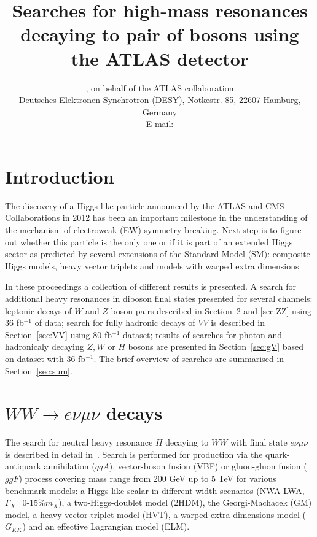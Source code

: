 \documentclass{PoS}
\title{Searches for high-mass resonances decaying to pair of bosons using the ATLAS detector}
\author{\speaker{Kirill Grevtsov}, {on behalf of the ATLAS collaboration}\\%
        Deutsches Elektronen-Synchrotron (DESY), Notkestr. 85, 22607 Hamburg, Germany\\
        E-mail: \email{kirill.grevtsov@cern.ch}}
\begin{document}
\linenumbers


\section{Introduction}

The discovery of a Higgs-like particle announced by the ATLAS and CMS Collaborations in 2012 \cite{HIGG-2012-27,CMS-HIG-12-028} has been an important milestone in the understanding of the mechanism of electroweak (EW) symmetry breaking. %
Next step is to figure out whether this particle is the only one or if it is part of an extended Higgs sector as predicted by several extensions of the Standard Model (SM): composite Higgs models, heavy vector triplets and models with warped extra dimensions


In these proceedings a collection of different results is presented.
A search for additional heavy resonances in diboson final states presented for several channels: leptonic decays of $W$ and $Z$ boson pairs described in Section~\ref{sec:WW} and \ref{sec:ZZ} using 36 fb$^{-1}$ of data; search for fully hadronic decays of $VV$ is described in Section~\ref{sec:VV} using 80 fb$^{-1}$ dataset; results of searches for photon and hadronicaly decaying $Z,W$ or $H$ bosons are presented in Section~\ref{sec:gV} based on dataset with 36 fb$^{-1}$. The brief overview of searches are summarised in Section~\ref{sec:sum}.


\section{$WW\rightarrow e\nu \mu \nu$ decays}
\label{sec:WW}
The search for neutral heavy resonance $H$ decaying to $WW$ with final state $e\nu \mu \nu$ is described in detail in~\cite{HIGG-2016-31}. Search is performed for production via the quark-antiquark annihilation ($q\bar{q}A$), vector-boson fusion (VBF) or gluon-gluon fusion ($ggF$) process covering mass range from 200 GeV up to 5 TeV for various benchmark models: a Higgs-like scalar in different width scenarios (NWA-LWA, $\Gamma_X$=0-15\%$m_X$), a two-Higgs-doublet model (2HDM), the Georgi-Machacek (GM) model, a heavy vector triplet model (HVT), a warped extra dimensions model ($G_{KK}$) and an effective Lagrangian model (ELM).
\end{document}

